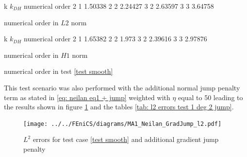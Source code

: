 \begin{table}[H]
\begin{subtable}[b]{0.45\textwidth}
\centering
	\pgfplotstabletypeset
	{
		k $k_{DH}$ {numerical order}
		2 1  1.50338
		2 2  2.24427
		3 2 2.63597
		3 3 3.64758
	}
	\caption{numerical order in $L2$ norm}
\end{subtable}
\begin{subtable}[b]{0.45\textwidth}
	\pgfplotstabletypeset
	{
		k $k_{DH}$ {numerical order}
		2 1  1.65382 
		2 2  1.973
		3 2 2.39616
		3 3 2.97876
	}
	\caption{numerical order in $H1$ norm}
	\end{subtable}
\caption{numerical order in test \ref{test smooth}}
\label{tab: order}
\end{table}

This test scenario was also performed with the additional normal jump penalty term as stated in \eqref{eq: neilan eq1 + jump} weighted with $\eta$ equal to 50 leading to the results shown in figure \ref{fig: l2 errors test 1 jump} and the tables \ref{tab: l2 errors test 1 deg 2 jump}.

\begin{figure}[h!]
\centering
	\texttt{[image: ../../FEniCS/diagrams/MA1\_Neilan\_GradJump\_l2.pdf]}
	\caption{$L^2$ errors for test case \ref{test smooth} and additional gradient jump penalty}
	\label{fig: l2 errors test 1 jump}
\end{figure}

